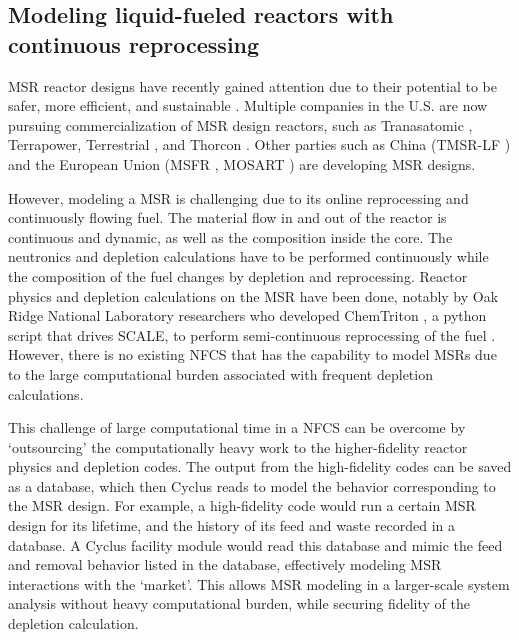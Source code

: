 \subsection{Modeling liquid-fueled reactors with continuous reprocessing}
\gls{MSR} reactor designs have recently gained attention due to 
their potential to be 
safer, more efficient, and sustainable \cite{serp_molten_2014}.
Multiple companies in the U.S. are now pursuing
commercialization of \gls{MSR} design reactors, such as Tranasatomic \cite{transatomic_technical_2016}
, Terrapower, Terrestrial \cite{leblanc_18-_2017}, and
Thorcon \cite{dolan_19-_2017}. Other parties such as China (TMSR-LF \cite{dai_17-_2017}) 
and the European Union (MSFR \cite{heuer_towards_2014}, MOSART \cite{ignatiev_molten_2014})
are developing \gls{MSR} designs.

However, modeling a \gls{MSR} is challenging due to its online reprocessing
and continuously flowing fuel.
The material flow in and out of the reactor is continuous and dynamic, as well as the
composition inside the core.
The neutronics and depletion calculations have to be performed continuously while
the composition of the fuel changes by depletion and reprocessing.
Reactor physics and depletion calculations
on the \gls{MSR} have been done, notably by 
 Oak Ridge National Laboratory researchers who developed
ChemTriton \cite{powers_new_2013}, a python script that drives SCALE,
to perform semi-continuous reprocessing of the fuel \cite{powers_inventory_2014, betzler_fuel_2018}.
However, there is no existing \gls{NFCS} that has the capability to model \glspl{MSR}
due to the large computational burden associated with frequent depletion calculations.

This challenge of large computational time in a \gls{NFCS} can be overcome by `outsourcing' the computationally
heavy work to the higher-fidelity reactor physics and depletion codes. The output from the
high-fidelity codes can be saved as a database, which then Cyclus reads to model the behavior
corresponding to the \gls{MSR} design. For example, a high-fidelity code would run a certain
\gls{MSR} design for its lifetime, and the history of its feed and waste recorded in a
database. A Cyclus facility module would read this database and mimic the feed and removal
behavior listed in the database, effectively modeling \gls{MSR} interactions with the `market'.
This allows \gls{MSR} modeling in a larger-scale system analysis without heavy computational
burden, while securing fidelity of the depletion calculation.